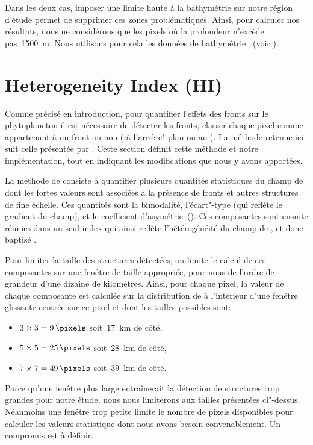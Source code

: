 Dans les deux cas, imposer une limite haute à la bathymétrie sur notre région d'étude permet de supprimer ces zones problématiques.
Ainsi, pour calculer nos résultats, nous ne considérons que les pixels où la profondeur n'excède pas~\qty{1500}{\m}.
Nous utilisons pour cela les données de bathymétrie ~(voir ).

\section{Heterogeneity Index (HI)}
\label{sec:HI}

Comme précisé en introduction, pour quantifier l'effets des fronts sur le phytoplancton il est nécessaire de détecter les fronts,  classer chaque pixel comme appartenant à un front ou non ( à l'arrière"-plan ou au ).
La méthode retenue ici suit celle présentée par \textcite{liu_2016} .
Cette section définit cette méthode et notre implémentation, tout en indiquant les modifications que nous y avons apportées.

La méthode de \textcite{liu_2016} consiste à quantifier plusieurs quantités statistiques du champ de  dont les fortes valeurs sont associées à la présence de fronts et autres structures de fine échelle.
Ces quantités sont la bimodalité, l'écart"-type (qui reflète le gradient du champ), et le coefficient d'asymétrie~().
Ces composantes sont ensuite réunies dans un seul index qui ainsi reflète l'hétérogénéité du champ de , et donc baptisé .

Pour limiter la taille des structures détectées, on limite le calcul de ces composantes sur une fenêtre de taille appropriée,  pour nous de l'ordre de grandeur d'une dizaine de kilomètres.
Ainsi, pour chaque pixel, la valeur de chaque composante est calculée sur la distribution de  à l'intérieur d'une fenêtre glissante centrée sur ce pixel et dont les tailles possibles sont:
\begin{itemize}
        \item \(3 \times 3 =\qty{9}{\pixels}\) soit~\qty{17}{\km} de côté,
        \item \(5 \times 5 =\qty{25}{\pixels}\) soit~\qty{28}{\km} de côté,
        \item \(7 \times 7 =\qty{49}{\pixels}\) soit~\qty{39}{\km} de côté.
\end{itemize}
Parce qu'une fenêtre plus large entraînerait la détection de structures trop grandes pour notre étude, nous nous limiterons aux tailles présentées ci"-dessus.
Néanmoins une fenêtre trop petite limite le nombre de pixels disponibles pour calculer les valeurs statistique dont nous avons besoin convenablement.
Un compromis est à définir.


